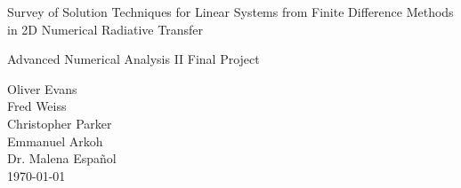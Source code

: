 \documentclass[10pt]{article}
\begin{document}
\null

\thispagestyle{empty}
\addtocounter{page}{-1}

\begin{center}
    \begin{sffamily}
    \begin{bfseries}
        \null
        \vfill
        \Huge{Survey of Solution Techniques for Linear Systems from Finite Difference Methods in 2D Numerical Radiative Transfer}

        \vspace{20pt}
        \LARGE{Advanced Numerical Analysis II Final Project} \\
        \vspace{20pt}
    \begin{Large}
        Oliver Evans \\
        Fred Weiss \\
        Christopher Parker \\
        Emmanuel Arkoh \\[1em]

        Dr. Malena Espa\~nol \\
    \vspace{20pt}
    \today
    \end{Large}
    \end{bfseries}
    \end{sffamily}
    \vspace{30pt}

    \null
    \vfill
    \vfill
    \null
\end{center}
\pagebreak


\renewcommand{\arraystretch}{1.5}
\end{document}
